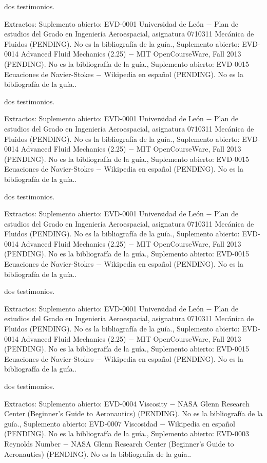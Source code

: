 \documentclass{book}
\begin{document}
\noindent dos testimonios.

\noindent Extractos: Suplemento abierto: EVD-0001 Universidad de León \(-\) Plan de estudios del Grado en Ingeniería Aeroespacial, asignatura 0710311 Mecánica de Fluidos (PENDING). No es la bibliografía de la guía., Suplemento abierto: EVD-0014 Advanced Fluid Mechanics (2.25) \(-\) MIT OpenCourseWare, Fall 2013 (PENDING). No es la bibliografía de la guía., Suplemento abierto: EVD-0015 Ecuaciones de Navier-Stokes \(-\) Wikipedia en español (PENDING). No es la bibliografía de la guía..

\noindent dos testimonios.

\noindent Extractos: Suplemento abierto: EVD-0001 Universidad de León \(-\) Plan de estudios del Grado en Ingeniería Aeroespacial, asignatura 0710311 Mecánica de Fluidos (PENDING). No es la bibliografía de la guía., Suplemento abierto: EVD-0014 Advanced Fluid Mechanics (2.25) \(-\) MIT OpenCourseWare, Fall 2013 (PENDING). No es la bibliografía de la guía., Suplemento abierto: EVD-0015 Ecuaciones de Navier-Stokes \(-\) Wikipedia en español (PENDING). No es la bibliografía de la guía..

\noindent dos testimonios.

\noindent Extractos: Suplemento abierto: EVD-0001 Universidad de León \(-\) Plan de estudios del Grado en Ingeniería Aeroespacial, asignatura 0710311 Mecánica de Fluidos (PENDING). No es la bibliografía de la guía., Suplemento abierto: EVD-0014 Advanced Fluid Mechanics (2.25) \(-\) MIT OpenCourseWare, Fall 2013 (PENDING). No es la bibliografía de la guía., Suplemento abierto: EVD-0015 Ecuaciones de Navier-Stokes \(-\) Wikipedia en español (PENDING). No es la bibliografía de la guía..

\noindent dos testimonios.

\noindent Extractos: Suplemento abierto: EVD-0001 Universidad de León \(-\) Plan de estudios del Grado en Ingeniería Aeroespacial, asignatura 0710311 Mecánica de Fluidos (PENDING). No es la bibliografía de la guía., Suplemento abierto: EVD-0014 Advanced Fluid Mechanics (2.25) \(-\) MIT OpenCourseWare, Fall 2013 (PENDING). No es la bibliografía de la guía., Suplemento abierto: EVD-0015 Ecuaciones de Navier-Stokes \(-\) Wikipedia en español (PENDING). No es la bibliografía de la guía..

\noindent dos testimonios.

\noindent Extractos: Suplemento abierto: EVD-0004 Viscosity \(-\) NASA Glenn Research Center (Beginner's Guide to Aeronautics) (PENDING). No es la bibliografía de la guía., Suplemento abierto: EVD-0007 Viscosidad \(-\) Wikipedia en español (PENDING). No es la bibliografía de la guía., Suplemento abierto: EVD-0003 Reynolds Number \(-\) NASA Glenn Research Center (Beginner's Guide to Aeronautics) (PENDING). No es la bibliografía de la guía..
\end{document}

